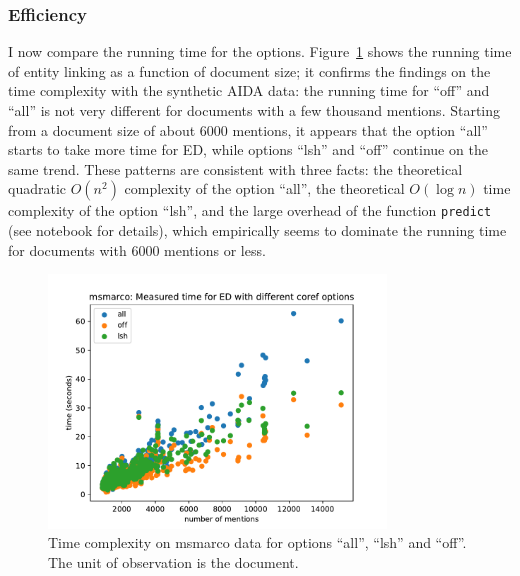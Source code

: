 \documentclass[a4paper,11pt]{article}
\numberwithin{equation}{section} %
\begin{document}
\subsubsection{Efficiency}

I now compare the running time for the options. Figure~\ref{fig:timing_msmarco} shows the running time of entity linking as a function of document size; it confirms the findings on the time complexity with the synthetic AIDA data:  the running time for ``off'' and ``all'' is not very different for documents with a few thousand mentions. 
Starting from a document size of about 6000 mentions, it appears that the option ``all'' starts to take more time for ED, while options ``lsh'' and ``off'' continue on the same trend.
These patterns are consistent with three facts: the theoretical quadratic $O(n^2)$ complexity of the option ``all'', the theoretical $O(\log{n})$ time complexity of the option ``lsh'', and the large overhead of the function \verb|predict| (see notebook for details), which  empirically seems to dominate the running time for documents with 6000 mentions or less.

\begin{figure}[H]
  \centering
  \includegraphics[width = 0.8\textwidth]{../figs/timing_msmarco.pdf}
  \caption{Time complexity on msmarco data for options ``all'', ``lsh'' and ``off''. The unit of observation is the document.}
  \label{fig:timing_msmarco}
\end{figure}




\end{document}
